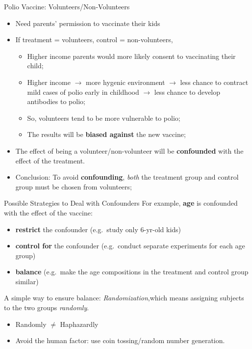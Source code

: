 \documentclass[
  ignorenonframetext, 10pt
]{beamer}
\providecommand{\tightlist}{%
  \setlength{\itemsep}{0pt}\setlength{\parskip}{0pt}}
\newcommand{\red}[1]{\textit{\textcolor{rubineRed}{#1}}}
\begin{document}
\begin{frame}{Polio Vaccine: Volunteers/Non-Volunteers}
\protect\hypertarget{polio-vaccine-volunteersnon-volunteers}{}
\begin{itemize}
\tightlist
\item
  Need parents' permission to vaccinate their kids
\item
  If treatment = volunteers, control = non-volunteers,

  \begin{itemize}
  \tightlist
  \item
    Higher income parents would more likely consent to vaccinating their
    child;
  \item
    Higher income \(\rightarrow\) more hygenic environment
    \(\rightarrow\) less chance to contract mild cases of polio early in
    childhood \(\rightarrow\) less chance to develop antibodies to
    polio;
  \item
    So, volunteers tend to be more vulnerable to polio;
  \item
    The results will be \textbf{biased against} the new vaccine;
  \end{itemize}
\item
  The effect of being a volunteer/non-volunteer will be
  \textbf{confounded} with the effect of the treatment.
\item
  Conclusion: To avoid \textbf{confounding}, \red{both} the treatment
  group and control group must be chosen from volunteers;
\end{itemize}
\end{frame}

\begin{frame}{Possible Strategies to Deal with Confounders}
\protect\hypertarget{possible-strategies-to-deal-with-confounders}{}
For example, \textbf{age} is confounded with the effect of the vaccine:

\begin{itemize}
\tightlist
\item
  \textbf{restrict} the confounder (e.g.~study only 6-yr-old kids)
\item
  \textbf{control for} the confounder (e.g.~conduct separate experiments
  for each age group)
\item
  \textbf{balance} (e.g.~make the age compositions in the treatment and
  control group similar) \bigskip\pause
\end{itemize}

A simple way to ensure balance: \red{Randomization},\newline which means
assigning subjects to the two groups \red{randomly}.

\begin{itemize}
\tightlist
\item
  Randomly \(\neq\) Haphazardly
\item
  Avoid the human factor: use coin tossing/random number generation.
\end{itemize}
\end{frame}
\end{document}
